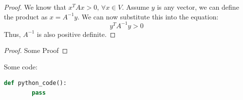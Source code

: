 \documentclass[11pt]{article}
\begin{document}
    \begin{proof}
        We know that $x^T A x > 0, \, \forall x \in V$.
        Assume $y$ is any vector, we can define the product as $x = A^{-1} y$.
        We can now substitute this into the equation:
        \[y^T A^{-1} y > 0\]
        Thus, $A^{-1}$ is also positive definite.
    \end{proof}






    \begin{proof}
        Some Proof
    \end{proof}

    Some code:
    \begin{lstlisting}[language=Python]
    def python_code():
        pass
    \end{lstlisting}
\end{document}
